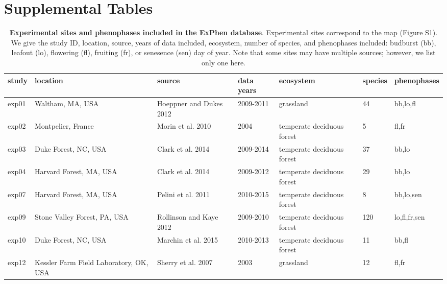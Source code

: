 \documentclass{article}
\begin{document}
\clearpage
\section* {Supplemental Tables}

\begin{table}[ht]
\centering
\caption{\textbf{Experimental sites and phenophases included in the ExPhen database}. Experimental sites correspond to the map (Figure S1). We give the study ID, location, source, years of data included, ecosystem, number of species, and phenophases included: budburst (bb), leafout (lo), flowering (fl), fruiting (fr), or senesence (sen) day of year. Note that some sites may have multiple sources; however, we list only one here.} 
\label{tab:studylocs}
\begingroup\footnotesize
\begin{tabular}{|p{}|p{}|p{}|p{}|p{}|p{}|p{}|}
  \hline
study & location & source & data years & ecosystem & species & phenophases \\ 
  \hline
exp01 & Waltham, MA, USA & Hoeppner and Dukes 2012 & 2009-2011 & grassland & 44 & bb,lo,fl \\ 
   \hline
exp02 & Montpelier, France & Morin et al. 2010 & 2004 & temperate deciduous forest & 5 & fl,fr \\ 
   \hline
exp03 & Duke Forest, NC, USA & Clark et al. 2014 & 2009-2014 & temperate deciduous forest & 37 & bb,lo \\ 
   \hline
exp04 & Harvard Forest, MA, USA & Clark et al. 2014 & 2009-2012 & temperate deciduous forest & 29 & bb,lo \\ 
   \hline
exp07 & Harvard Forest, MA, USA & Pelini et al. 2011 & 2010-2015 & temperate deciduous forest & 8 & bb,lo,sen \\ 
   \hline
exp09 & Stone Valley Forest, PA, USA & Rollinson and Kaye 2012 & 2009-2010 & temperate deciduous forest & 120 & lo,fl,fr,sen \\ 
   \hline
exp10 & Duke Forest, NC, USA & Marchin et al. 2015 & 2010-2013 & temperate deciduous forest & 11 & bb,fl \\ 
   \hline
exp12 & Kessler Farm Field Laboratory, OK, USA & Sherry et al. 2007 & 2003 & grassland & 12 & fl,fr \\ 
   \hline
\end{tabular}
\endgroup
\end{table}%
\end{document}
